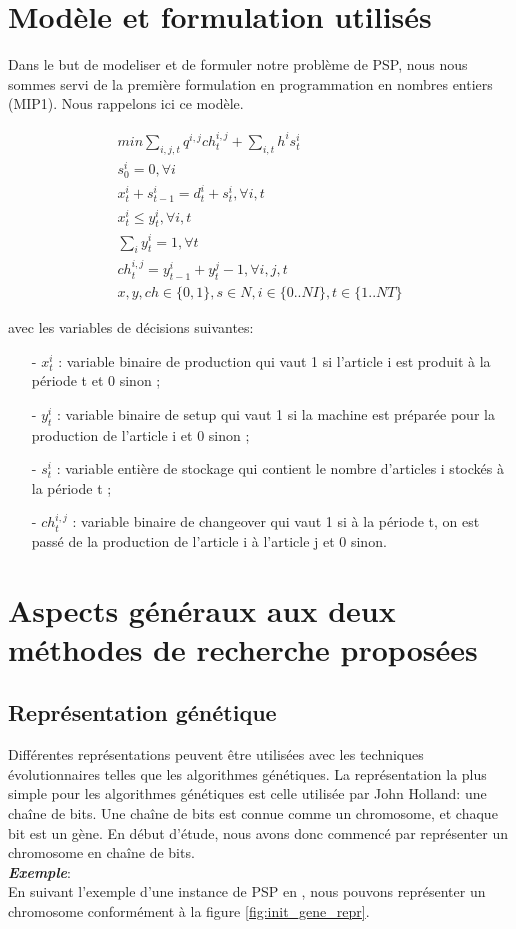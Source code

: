 \documentclass[12pt,a4paper]{article}
\begin{document}
	\section{Modèle et formulation utilisés}
	Dans le but de modeliser et de formuler notre problème de PSP, nous nous sommes servi de la première formulation en programmation en nombres entiers (MIP1). Nous rappelons ici ce modèle. 
	
	\begin{eqnarray}
		min \sum_{i,j,t} q^{i,j}ch_{t}^{i,j} + \sum_{i,t} h^{i} s_{t}^{i} \\
		s_{0}^{i} = 0, \forall i \\
		x_{t}^{i} + s_{t-1}^{i} = d_{t}^{i} + s_{t}^{i}, \forall i,t \\
		x_{t}^{i} \leq y_{t}^{i}, \forall i,t \\
		\sum_{i} y_{t}^{i} = 1 , \forall t \\
		ch_{t}^{i,j} = y_{t-1}^{i} + y_{t}^{j} - 1, \forall i,j,t \\
		x,y,ch \in \{0,1\}, s \in N, i \in \{0..NI\}, t \in \{1..NT\}
	\end{eqnarray}
		
		avec les variables de décisions suivantes: \\
		\begin{itemize}
			\item[-] $x_{t}^{i}$ : variable binaire de production qui vaut 1 si l’article i est produit à la période t et 0 sinon ;
			\item[-] $y_{t}^{i}$ : variable binaire de setup qui vaut 1 si la machine est préparée pour la production de l’article i et 0 sinon ;
			\item[-] $s_{t}^{i}$ : variable entière de stockage qui contient le nombre d’articles i stockés à la période t ; 
			\item[-] $ch_{t}^{i,j}$ : variable binaire de changeover qui vaut 1 si à la période t, on est passé de la production de l’article i à l’article j et 0 sinon.
		\end{itemize}
	
	\section{Aspects généraux aux deux méthodes de recherche proposées}
	\subsection{Représentation génétique}
	Différentes représentations peuvent être utilisées avec les techniques évolutionnaires telles que les algorithmes génétiques. La représentation la plus simple pour les algorithmes génétiques est celle utilisée par John Holland: une chaîne de bits. Une chaîne de bits est connue comme un chromosome, et chaque bit est un gène. En début d'étude, nous avons donc commencé par représenter un chromosome en chaîne de bits. \\
	\textsl{\textbf{Exemple}}:\\
	\hspace*{.5cm} En suivant l'exemple d'une instance de PSP en \pageref{sec:problem_description}, nous pouvons représenter un chromosome conformément à la figure \ref{fig:init_gene_repr}.
	
\end{document}
